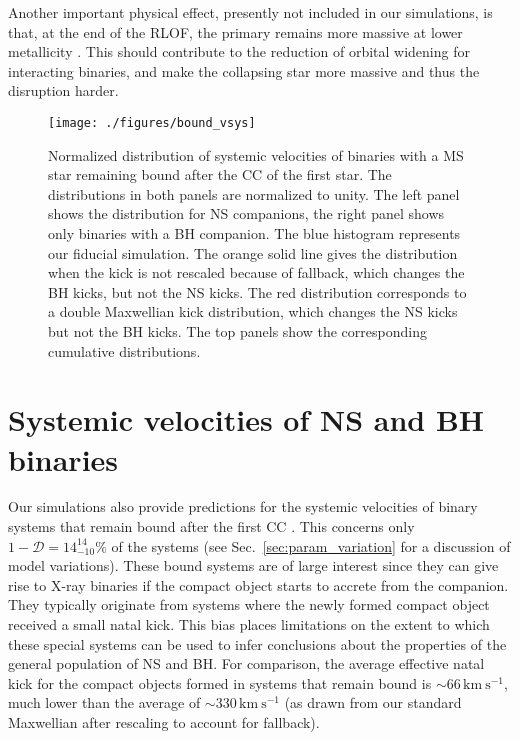 \documentclass{aa}
\DeclareRobustCommand{\Secref}[1]{Sec.~\ref{#1}}
\begin{document}
Another important physical effect, presently not included in
our simulations, is that, at the end of the RLOF, the primary remains more massive at
lower metallicity \citep[owing again to the smaller radii, e.g.][]{gotberg:17,yoon:17}. This
should contribute to the reduction of orbital widening for interacting binaries,
and make the collapsing star more massive and thus the disruption harder.




\begin{figure*}[!htbp]
  \centering
  \texttt{[image: ./figures/bound\_vsys]}
  \caption{Normalized distribution of systemic velocities of binaries
    with a MS star remaining bound after the CC of the first star. The
    distributions in both panels are normalized to unity. The left panel shows
    the distribution for NS companions, the right panel shows only
    binaries with a BH companion. The blue histogram
    represents our fiducial simulation. The orange solid line gives the
    distribution when the kick is not rescaled because of
    fallback, which changes the BH kicks, but not the NS kicks. The red distribution corresponds to a double Maxwellian
    kick distribution, which changes the NS kicks but not the BH kicks. The top panels show the corresponding cumulative distributions.}
  \label{fig:bound_v_dist}
\end{figure*}



\section{Systemic velocities of NS and BH binaries}
\label{sec:bound}

Our simulations also provide predictions for the systemic velocities of binary systems that remain bound after the first CC  \citep[e.g.,][]{vanoijen:89}. This concerns only \mbox{$1-\mathcal{D} = 14_{-10}^{14}\%$} of the systems (see \Secref{sec:param_variation} for a discussion of model variations).  These bound systems are of large interest since they can give rise to X-ray binaries if the compact object starts to accrete from the companion.  They typically originate from systems where the newly formed compact object received a small natal kick. This bias places  limitations on the extent to which these special systems can be used to infer conclusions about the properties of the general population of NS and BH.  For comparison, the average effective natal kick for the compact objects formed in systems that remain bound is  $\sim$$66\,\mathrm{km\ s^{-1}}$, much lower than the average of $\sim$$330\,\mathrm{km\ s^{-1}}$ (as drawn from our standard Maxwellian after rescaling to account for fallback). 
\end{document}

